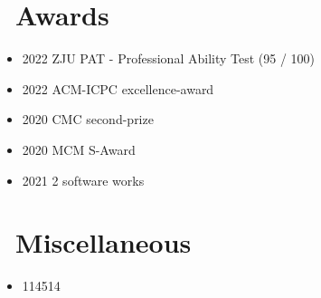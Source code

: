 \documentclass{resume}
\begin{document}

\section{\faCalendarCheckO\ Awards}
\begin{itemize}[parsep=0.5ex]
  \item 2022 ZJU PAT - Professional Ability Test (95 / 100)
  \item 2022 ACM-ICPC excellence-award
  \item 2020 CMC second-prize
  \item 2020 MCM S-Award
  \item 2021 2 software works
\end{itemize}

\section{\faPlusCircle\ Miscellaneous}
\begin{itemize}[parsep=0.5ex]
  \item 114514
\end{itemize}

%
%
\end{document}
